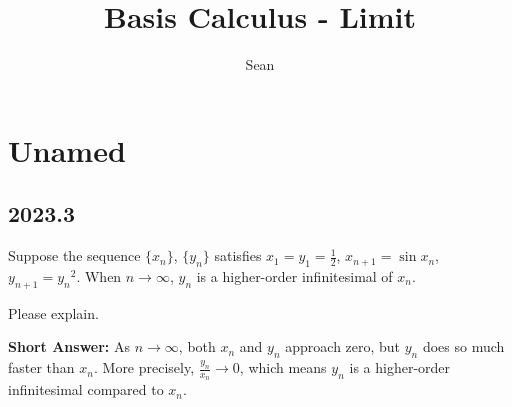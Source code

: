 \documentclass[a4paper,12pt]{article}
\begin{document}
	
\title{Basis Calculus - Limit}
\author{Sean}

\maketitle

\tableofcontents

\newpage

\section{Unamed}

\subsection{2023.3}

\begin{bluebox}
Suppose the sequence \(\{x_n\}\), \(\{y_n\}\) satisfies \( x_1=y_1=\frac{1}{2} \), \( x_{n+1} = \sin{x_n} \), \( y_{n+1} = {y_n}^2\). When \(n\to \infty\), \(y_n\) is a higher-order infinitesimal of \(x_n\).

Please explain.
\end{bluebox}

\textbf{Short Answer:}\newline
As \(n \to \infty\), both \(x_n\) and \(y_n\) approach zero, but \(y_n\) does so much faster than \(x_n\). More precisely, \(\frac{y_n}{x_n} \to 0\), which means \(y_n\) is a higher-order infinitesimal compared to \(x_n\).
\end{document}
